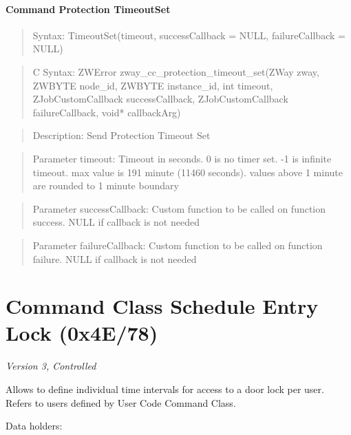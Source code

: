 \paragraph{Command Protection TimeoutSet}
\begin{quote}Syntax: TimeoutSet(timeout, successCallback = NULL, failureCallback = NULL)\end{quote}
\begin{quote}C Syntax: ZWError zway\_cc\_protection\_timeout\_set(ZWay zway, ZWBYTE node\_id, ZWBYTE instance\_id, int timeout, ZJobCustomCallback successCallback, ZJobCustomCallback failureCallback, void* callbackArg)\end{quote}
\begin{quote}Description: Send Protection Timeout Set\end{quote}
\begin{quote}Parameter timeout: Timeout in seconds. 0 is no timer set. -1 is infinite timeout. max value is 191 minute (11460 seconds). values above 1 minute are rounded to 1 minute boundary\end{quote}
\begin{quote}Parameter successCallback: Custom function to be called on function success. NULL if callback is not needed\end{quote}
\begin{quote}Parameter failureCallback: Custom function to be called on function failure. NULL if callback is not needed\end{quote}



\section{Command Class Schedule Entry Lock (0x4E/78)}

\textit{Version 3, Controlled}
\newline

Allows to define individual time intervals for access to a door lock per user. Refers to users defined by User Code Command Class.
\newline

\noindent
Data holders:

